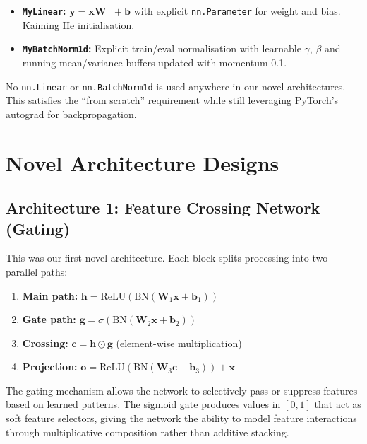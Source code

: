 \documentclass[11pt,a4paper]{article}
\begin{document}
\begin{itemize}[leftmargin=1.2em,itemsep=0.15em]
    \item \textbf{\texttt{MyLinear}:} $\mathbf{y} = \mathbf{x}\mathbf{W}^\top + \mathbf{b}$ with explicit \texttt{nn.Parameter} for weight and bias. Kaiming He initialisation.
    \item \textbf{\texttt{MyBatchNorm1d}:} Explicit train/eval normalisation with learnable $\gamma$, $\beta$ and running-mean/variance buffers updated with momentum 0.1.
\end{itemize}

No \texttt{nn.Linear} or \texttt{nn.BatchNorm1d} is used anywhere in our novel architectures. This satisfies the ``from scratch'' requirement while still leveraging PyTorch's autograd for backpropagation.

\section{Novel Architecture Designs}

\subsection{Architecture 1: Feature Crossing Network (Gating)}

This was our first novel architecture. Each block splits processing into two parallel paths:

\begin{enumerate}[leftmargin=1.2em,itemsep=0.1em]
    \item \textbf{Main path:} $\mathbf{h} = \text{ReLU}(\text{BN}(\mathbf{W}_1 \mathbf{x} + \mathbf{b}_1))$
    \item \textbf{Gate path:} $\mathbf{g} = \sigma(\text{BN}(\mathbf{W}_2 \mathbf{x} + \mathbf{b}_2))$
    \item \textbf{Crossing:} $\mathbf{c} = \mathbf{h} \odot \mathbf{g}$ (element-wise multiplication)
    \item \textbf{Projection:} $\mathbf{o} = \text{ReLU}(\text{BN}(\mathbf{W}_3 \mathbf{c} + \mathbf{b}_3)) + \mathbf{x}$
\end{enumerate}

The gating mechanism allows the network to selectively pass or suppress features based on learned patterns. The sigmoid gate produces values in $[0,1]$ that act as soft feature selectors, giving the network the ability to model feature interactions through multiplicative composition rather than additive stacking.
\end{document}
